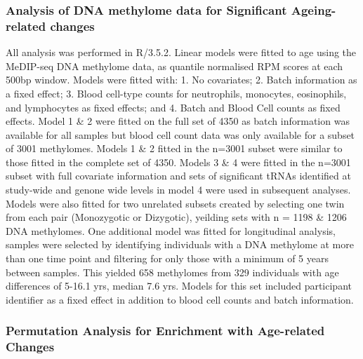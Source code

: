 \documentclass[]{book}
\begin{document}
\hypertarget{medipmodels}{%
\subsubsection{Analysis of DNA methylome data for Significant Ageing-related changes}\label{medipmodels}}

All analysis was performed in R/3.5.2.
Linear models were fitted to age using the MeDIP-seq DNA methylome data, as quantile normalised RPM scores at each 500bp window.
Models were fitted with: 1. No covariates; 2. Batch information as a fixed effect; 3. Blood cell-type counts for neutrophils, monocytes, eosinophils, and lymphocytes as fixed effects; and 4. Batch and Blood Cell counts as fixed effects.
Model 1 \& 2 were fitted on the full set of 4350 as batch information was available for all samples but blood cell count data was only available for a subset of 3001 methylomes.
Models 1 \& 2 fitted in the n=3001 subset were similar to those fitted in the complete set of 4350.
Models 3 \& 4 were fitted in the n=3001 subset with full covariate information and sets of significant tRNAs identified at study-wide and genone wide levels in model 4 were used in subsequent analyses.
Models were also fitted for two unrelated subsets created by selecting one twin from each pair (Monozygotic or Dizygotic), yeilding sets with n = 1198 \& 1206 DNA methylomes.
One additional model was fitted for longitudinal analysis, samples were selected by identifying individuals with a DNA methylome at more than one time point and filtering for only those with a minimum of 5 years between samples.
This yielded 658 methylomes from 329 individuals with age differences of 5-16.1 yrs, median 7.6 yrs.
Models for this set included participant identifier as a fixed effect in addition to blood cell counts and batch information.

\hypertarget{AgeErichmentPermutation}{%
\subsubsection{Permutation Analysis for Enrichment with Age-related Changes}\label{AgeErichmentPermutation}}
\end{document}
